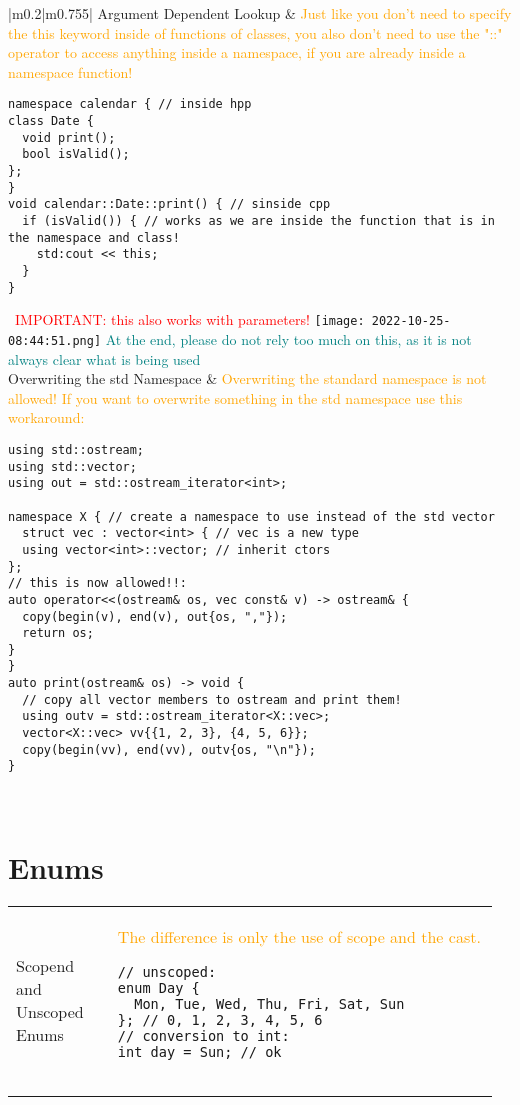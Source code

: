 \documentclass[main.tex,fontsize=8pt,paper=a4,paper=portrait,DIV=calc,]{scrartcl}
\begin{document}
\pagebreak
\begin{table}[ht!]
\begin{tabular}{|m{0.2\linewidth}|m{0.755\linewidth}|}
\hline
Argument Dependent Lookup & 
\textcolor{orange}{Just like you don't need to specify the this keyword inside of functions of classes,\newline
you also don't need to use the "::" operator to access anything inside a namespace, if you are already inside a namespace function!}\newline
\begin{lstlisting}
namespace calendar { // inside hpp
class Date {
  void print();
  bool isValid();
};
}
void calendar::Date::print() { // sinside cpp
  if (isValid()) { // works as we are inside the function that is in the namespace and class!
    std:cout << this;
  }
}
\end{lstlisting}
\, \newline
\textcolor{red}{IMPORTANT: this also works with parameters!}\newline
\texttt{[image: 2022-10-25-08:44:51.png]}\newline
\textcolor{teal}{At the end, please do not rely too much on this, as it is not always clear what is being used}\\
\hline
Overwriting the std Namespace & 
\textcolor{orange}{Overwriting the standard namespace is not allowed!\newline
If you want to overwrite something in the std namespace use this workaround:}\newline
\begin{lstlisting}
using std::ostream;
using std::vector;
using out = std::ostream_iterator<int>;

namespace X { // create a namespace to use instead of the std vector
  struct vec : vector<int> { // vec is a new type
  using vector<int>::vector; // inherit ctors
};
// this is now allowed!!:
auto operator<<(ostream& os, vec const& v) -> ostream& { 
  copy(begin(v), end(v), out{os, ","});
  return os;
}
}
auto print(ostream& os) -> void {
  // copy all vector members to ostream and print them!
  using outv = std::ostream_iterator<X::vec>;
  vector<X::vec> vv{{1, 2, 3}, {4, 5, 6}};
  copy(begin(vv), end(vv), outv{os, "\n"});
}
\end{lstlisting}\\
\hline
\end{tabular}
\section{Enums}
\begin{tabular}{|m{0.2\linewidth}|m{0.755\linewidth}|}
\hline
Scopend and Unscoped Enums &
\textcolor{orange}{The difference is only the use of scope and the cast.}\newline
\begin{lstlisting}
// unscoped:
enum Day { 
  Mon, Tue, Wed, Thu, Fri, Sat, Sun
}; // 0, 1, 2, 3, 4, 5, 6
// conversion to int:
int day = Sun; // ok


\end{lstlisting}
\end{tabular}
\end{table}
\end{document}
